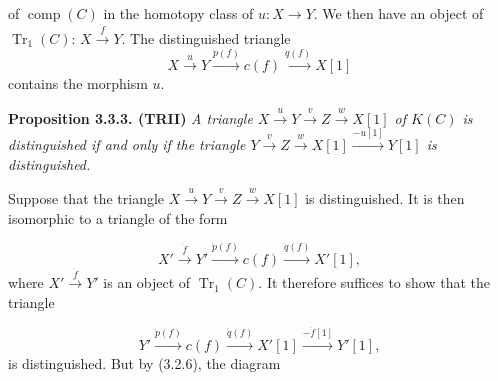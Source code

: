 \clearpage
{}%
\begingroup
\setlength{\abovedisplayskip}{3pt plus 2pt minus 2pt}%
\setlength{\belowdisplayskip}{3pt plus 2pt minus 2pt}%
of $\operatorname{comp}(C)$ in the homotopy class of
$u\colon X\to Y$.
We then have an object of $\operatorname{Tr}_1(C)$:
$X\xrightarrow{\dot f}Y$.
The distinguished triangle
\begin{equation*}
  X\xrightarrow{u}Y\xrightarrow{\dot p(f)}c(f)
  \xrightarrow{\dot q(f)}X[1]
\end{equation*}
contains the morphism $u$.

\noindent\textbf{Proposition 3.3.3. (TRII)}\quad
{}
\textit{A triangle
$X\xrightarrow{u}Y\xrightarrow{v}Z\xrightarrow{w}X[1]$ of $K(C)$ is
distinguished if and only if the triangle
$Y\xrightarrow{v}Z\xrightarrow{w}X[1]\xrightarrow{-u[1]}Y[1]$ is
distinguished.}

Suppose that the triangle
$X\xrightarrow{u}Y\xrightarrow{v}Z\xrightarrow{w}X[1]$ is distinguished.
It is then isomorphic to a triangle of the form

\begin{equation*}
  X'\xrightarrow{\dot f}Y'\xrightarrow{\dot p(f)}c(f)
  \xrightarrow{\dot q(f)}X'[1],
\end{equation*}
where $X'\xrightarrow{\dot f}Y'$ is an object of $\operatorname{Tr}_1(C)$.
It therefore suffices to show that the triangle

\begin{equation*}
  Y'\xrightarrow{\dot p(f)}c(f)\xrightarrow{\dot q(f)}X'[1]
  \xrightarrow{-\dot f[1]}Y'[1],
\end{equation*}
is distinguished. But by (3.2.6), the diagram

